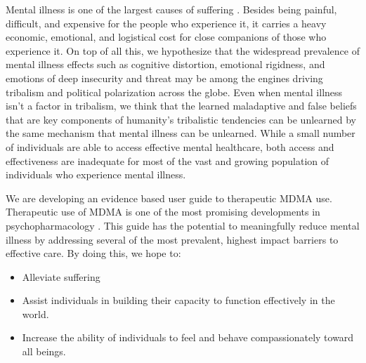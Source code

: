 \documentclass[12pt,letterpaper]{book}
\begin{document}
Mental illness is one of the largest causes of suffering \cite{mentalhealthpriority}. Besides being painful, difficult, and expensive for the people who experience it, it carries a heavy economic, emotional, and logistical cost for close companions of those who experience it. On top of all this, we hypothesize that the widespread prevalence of mental illness effects such as cognitive distortion, emotional rigidness, and emotions of deep insecurity and threat may be among the engines driving tribalism and political polarization across the globe. Even when mental illness isn't a factor in tribalism, we think that the learned maladaptive and false beliefs that are key components of humanity's tribalistic tendencies \cite{klein2020Polarized} can be unlearned by the same mechanism that mental illness can be unlearned. While a small number of individuals are able to access effective mental healthcare, both access and effectiveness are inadequate for most of the vast and growing population of individuals who experience mental illness.

We are developing an evidence based user guide to therapeutic MDMA use. Therapeutic use of MDMA is one of the most promising developments in psychopharmacology \cite{mitchellMDMAClinicalTrial2}. This guide has the potential to meaningfully reduce mental illness by addressing several of the most prevalent, highest impact barriers to effective care. By doing this, we hope to:
\begin{itemize}
	\item Alleviate suffering
	\item Assist individuals in building their capacity to function effectively in the world.
	\item Increase the ability of individuals to feel and behave compassionately toward all beings.
\end{itemize}
\end{document}
